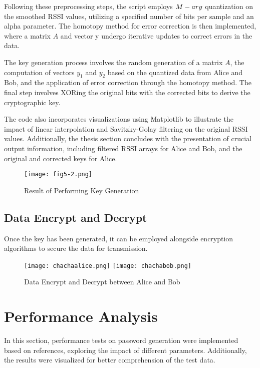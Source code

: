 Following these preprocessing steps, the script employs $M\--ary$ quantization on the smoothed RSSI values, utilizing a specified number of bits per sample and an alpha parameter. The homotopy method for error correction is then implemented, where a matrix \(A\) and vector y undergo iterative updates to correct errors in the data.

The key generation process involves the random generation of a matrix \(A\), the computation of vectors \(y_1\) and \(y_2\) based on the quantized data from Alice and Bob, and the application of error correction through the homotopy method. The final step involves XORing the original bits with the corrected bits to derive the cryptographic key.

The code also incorporates visualizations using Matplotlib to illustrate the impact of linear interpolation and Savitzky-Golay filtering on the original RSSI values. Additionally, the thesis section concludes with the presentation of crucial output information, including filtered RSSI arrays for Alice and Bob, and the original and corrected keys for Alice.
\begin{figure}
  \centering
  \texttt{[image: fig5-2.png]}
  \caption{Result of Performing Key Generation}
  \label{fig:5-2}
\end{figure}

\subsection{Data Encrypt and Decrypt}
Once the key has been generated, it can be employed alongside encryption algorithms to secure the data for transmission.

\begin{figure}
  \centering
  {\texttt{[image: chachaalice.png]}}
  {\texttt{[image: chachabob.png]}}
  \caption{Data Encrypt and Decrypt between Alice and Bob}\label{Data Encrypt and Decrypt}
  \end{figure}

\section{Performance Analysis}
In this section, performance tests on password generation were implemented based on references, exploring the impact of different parameters. Additionally, the results were visualized for better comprehension of the test data.

